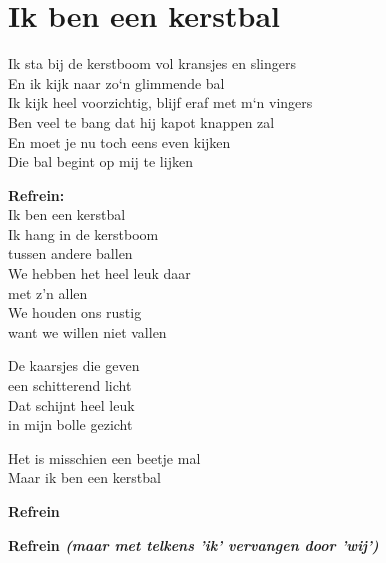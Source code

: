 \section{Ik ben een kerstbal}
Ik sta bij de kerstboom vol kransjes en slingers\\
En ik kijk naar zo`n glimmende bal\\
Ik kijk heel voorzichtig, blijf eraf met m`n vingers\\
Ben veel te bang dat hij kapot knappen zal\\
En moet je nu toch eens even kijken\\
Die bal begint op mij te lijken

\textbf{Refrein:}\\
Ik ben een kerstbal\\
Ik hang in de kerstboom\\
tussen andere ballen\\
We hebben het heel leuk daar\\
met z'n allen\\
We houden ons rustig\\
want we willen niet vallen

De kaarsjes die geven\\
een schitterend licht\\
Dat schijnt heel leuk\\
in mijn bolle gezicht

Het is misschien een beetje mal\\
Maar ik ben een kerstbal

\textbf{Refrein}

\textbf{Refrein \textit{(maar met telkens 'ik' vervangen door 'wij')}}
